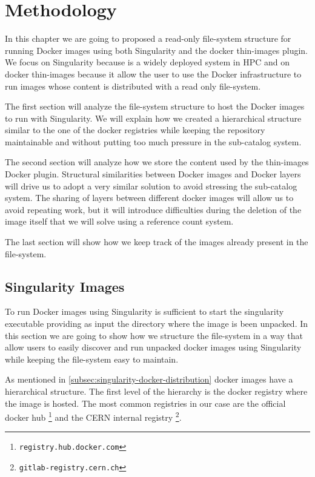 \chapter{Methodology}\label{ch:Methodology}

In this chapter we are going to proposed a read-only file-system structure for
running Docker images using both Singularity and the docker thin-images plugin.
We focus on Singularity because is a widely deployed system in HPC and on
docker thin-images because it allow the user to use the Docker infrastructure
to run images whose content is distributed with a read only file-system.

The first section will analyze the file-system structure to host the Docker
images to run with Singularity. We will explain how we created a hierarchical
structure similar to the one of the docker registries while keeping the
repository maintainable and without putting too much pressure in the
sub-catalog system.

The second section will analyze how we store the content used by the thin-images
Docker plugin. Structural similarities between Docker images and Docker layers
will drive us to adopt a very similar solution to avoid stressing the
sub-catalog system. The sharing of layers between different docker images will
allow us to avoid repeating work, but it will introduce difficulties during the
deletion of the image itself that we will solve using a reference count system.

The last section will show how we keep track of the images already present in
the file-system.

\section{Singularity Images}

To run Docker images using Singularity is sufficient to start the singularity
executable providing as input the directory where the image is been unpacked.
In this section we are going to show how we structure the file-system in a way
that allow users to easily discover and run unpacked docker images using
Singularity while keeping the file-system easy to maintain.

As mentioned in \ref{subsec:singularity-docker-distribution} docker images have
a hierarchical structure.  The first level of the hierarchy is the docker
registry where the image is hosted.  The most common registries in our case are
the official docker hub \footnote{\texttt{registry.hub.docker.com}} and the
CERN internal registry \footnote{\texttt{gitlab-registry.cern.ch}}.

